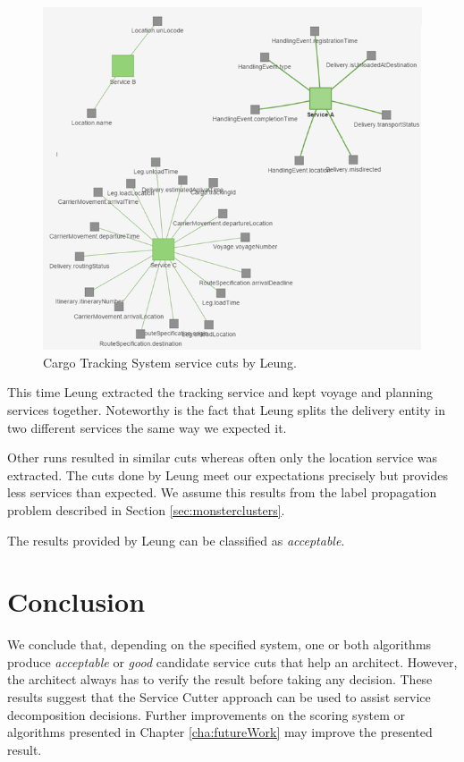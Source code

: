 \begin{figure}[H]
	\includegraphics[scale=0.9]{images/leung_tracking.png}
	\caption{Cargo Tracking System service cuts by Leung.}
	\label{fig:dddleungTracking}
\end{figure}

This time Leung extracted the tracking service and kept voyage and planning services together. Noteworthy is the fact that Leung splits the delivery entity in two different services the same way we expected it. 

Other runs resulted in similar cuts whereas often only the location service was extracted. The cuts done by Leung meet our expectations precisely but provides less services than expected. We assume this results from the label propagation problem described in Section \ref{sec:monsterclusters}. 

The results provided by Leung can be classified as \textit{acceptable}.

\section{Conclusion}
We conclude that, depending on the specified system, one or both algorithms produce \textit{acceptable} or \textit{good} candidate service cuts that help an architect. However, the architect always has to verify the result before taking any decision. These results suggest that the Service Cutter approach can be used to assist service decomposition decisions. Further improvements on the scoring system or algorithms presented in Chapter \ref{cha:futureWork} may improve the presented result.

